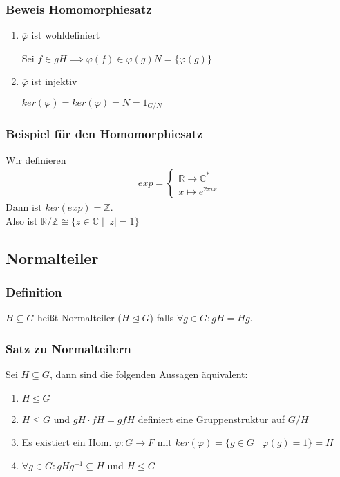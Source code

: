 \documentclass[12pt, german]{article}
\begin{document}
	\subsubsection{Beweis Homomorphiesatz}
	\begin{enumerate}[label=\arabic*)]
		\item $\overline{\varphi}$ ist wohldefiniert ~\par
		Sei $f\in gH \implies \varphi(f) \in \varphi(g)N = \{\varphi(g)\}$
		
		\item $\overline{\varphi}$ ist injektiv ~\par
		$ker(\overline{\varphi}) = ker(\varphi) = N = 1_{G/N}$
	\end{enumerate}
	
	\subsubsection{Beispiel für den Homomorphiesatz}
	Wir definieren 
	\begin{align*}
		exp = \begin{cases}
			\mathbb{R} \to \mathbb{C}^\ast\\
			x \mapsto e^{2\pi i x}
		\end{cases}
	\end{align*}
	Dann ist $ker(exp) = \mathbb Z $.\\ 
	Also ist $\mathbb R / \mathbb Z \cong \{z \in \mathbb C \mid |z| = 1\}$	
	
	
	
	\subsection{Normalteiler}		
	\subsubsection{Definition}
	$H \subseteq G$ heißt Normalteiler ($H\trianglelefteq G$) falls $\forall g \in G : gH = Hg$. 
	
	\subsubsection{Satz zu Normalteilern}
	Sei $H \subseteq G$, dann sind die folgenden Aussagen äquivalent: 
	\begin{enumerate}[label=\arabic*)]
		\item $H\trianglelefteq G$
		\item $H \leq G$ und $gH \cdot fH = gfH$ definiert eine Gruppenstruktur auf $G/H$
		\item Es existiert ein Hom. $\varphi: G \to F$ mit $ker(\varphi) = \{g \in G \mid \varphi(g)= 1\} = H$
		\item $\forall g \in G : gHg^{-1} \subseteq H$ und $H \leq G$
	\end{enumerate}
	
\end{document}
